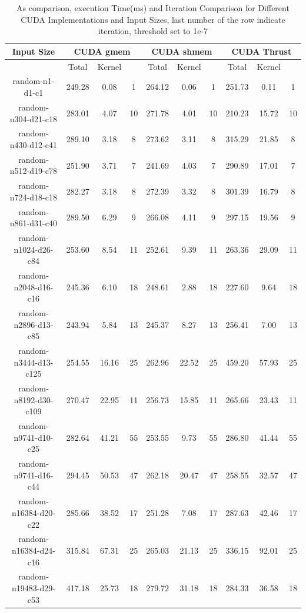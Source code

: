 \documentclass[letterpaper,12pt]{article}
\theoremstyle{remark}
\begin{document}
\begin{table}[ht]
\centering
\caption{As comparison, execution Time(ms) and Iteration Comparison for Different CUDA Implementations and Input Sizes, last number of the row indicate iteration, threshold set to 1e-7}
\begin{tabular}{|c|c|c|c|c|c|c|c|c|c|}
\hline
\textbf{Input Size} & \multicolumn{3}{c|}{\textbf{CUDA gmem}} & \multicolumn{3}{c|}{\textbf{CUDA shmem}} & \multicolumn{3}{c|}{\textbf{CUDA Thrust}} \\
\hline
& Total & Kernel  &  & Total & Kernel &   & Total & Kernel & \\
\hline
random-n1-d1-c1      & 249.28 & 0.08  & 1  & 264.12 & 0.06 & 1  & 251.73 & 0.11 & 1 \\
random-n304-d21-c18  & 283.01 & 4.07  & 10 & 271.78 & 4.01 & 10 & 210.23 & 15.72 & 10 \\
random-n430-d12-c41  & 289.10 & 3.18  & 8  & 273.62 & 3.11 & 8  & 315.29 & 21.85 & 8  \\
random-n512-d19-c78  & 251.90 & 3.71  & 7  & 241.69 & 4.03 & 7  & 290.89 & 17.01 & 7  \\
random-n724-d18-c18  & 282.27 & 3.18  & 8  & 272.39 & 3.32 & 8  & 301.39 & 16.79 & 8  \\
random-n861-d31-c40  & 289.50 & 6.29  & 9  & 266.08 & 4.11 & 9  & 297.15 & 19.56 & 9  \\
random-n1024-d26-c84 & 253.60 & 8.54  & 11 & 252.61 & 9.39 & 11 & 263.36 & 29.09 & 11 \\
random-n2048-d16-c16 & 245.36 & 6.10  & 18 & 248.61 & 2.88 & 18 & 227.60 & 9.64  & 18 \\
random-n2896-d13-c85 & 243.94 & 5.84  & 13 & 245.37 & 8.27 & 13 & 256.41 & 7.00  & 13 \\
random-n3444-d13-c125& 254.55 & 16.16 & 25 & 262.96 & 22.52& 25 & 459.20 & 57.93 & 25 \\
random-n8192-d30-c109& 270.47 & 22.95 & 11 & 256.73 & 15.85& 11 & 265.66 & 23.43 & 11 \\
random-n9741-d10-c25 & 282.64 & 41.21 & 55 & 253.55 & 9.73 & 55 & 286.80 & 41.44 & 55 \\
random-n9741-d16-c44 & 294.45 & 50.53 & 47 & 262.18 & 20.47& 47 & 258.55 & 32.57 & 47 \\
random-n16384-d20-c22& 285.66 & 38.52 & 17 & 251.28 & 7.08 & 17 & 287.63 & 42.46 & 17 \\
random-n16384-d24-c16& 315.84 & 67.31 & 25 & 265.03 & 21.13& 25 & 336.15 & 92.01 & 25 \\
random-n19483-d29-c53& 417.18 & 25.73 & 18 & 279.72 & 31.18& 18 & 284.33 & 36.58 & 18 \\

\end{tabular}
\end{table}
\end{document}
